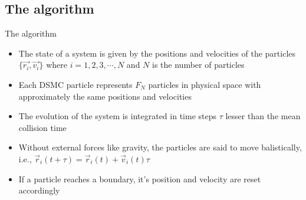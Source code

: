 \documentclass{beamer}
\begin{document}
    \subsection{The algorithm}

        \begin{frame}{The algorithm}
            \begin{itemize}
                \setlength\itemsep{0.25cm}
                
                \item<1->The state of a system is given by the positions and velocities of the particles $\{ \vec{r_i}, \vec{v_i} \}$ where $i = 1, 2, 3, \cdots, N$ and $N$ is the number of particles

                \item<2->Each DSMC particle represents $F_N$ particles in physical space with approximately the same positions and velocities

                \item<3->The evolution of the system is integrated in time steps $\tau$ lesser than the mean collision time

                \item<4->Without external forces like gravity, the particles are said to move balistically, i.e., $\vec{r}_i(t + \tau) = \vec{r}_i(t) + \vec{v}_i(t)\tau$

                \item<5->If a particle reaches a boundary, it's position and velocity are reset accordingly
            \end{itemize}
        \end{frame}
\end{document}
